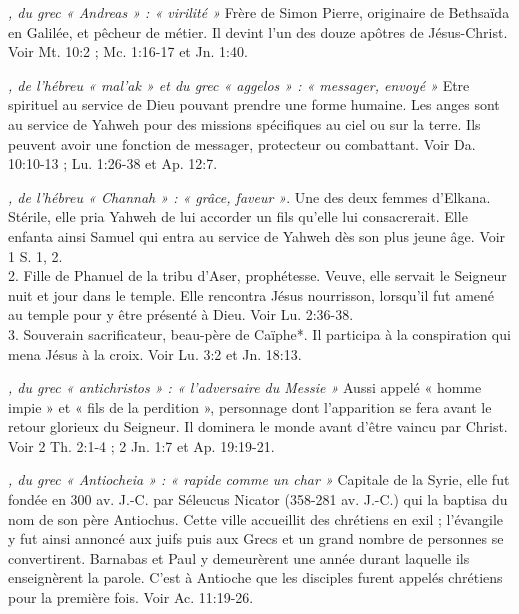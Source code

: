 \begin{multicols}{2}
\textit{, du grec « Andreas » : « virilité »}\newline
Frère de Simon Pierre, originaire de Bethsaïda en Galilée, et pêcheur de métier. Il devint l'un des douze apôtres de Jésus-Christ. Voir Mt. 10:2 ; Mc. 1:16-17 et Jn. 1:40.

\textit{, de l'hébreu « mal'ak » et du grec « aggelos » : « messager, envoyé »}\newline
Etre spirituel au service de Dieu pouvant prendre une forme humaine. Les anges sont au service de Yahweh pour des missions spécifiques au ciel ou sur la terre. Ils peuvent avoir une fonction de messager, protecteur ou combattant. Voir Da. 10:10-13 ; Lu. 1:26-38 et Ap. 12:7.

\textit{, de l'hébreu « Channah » : « grâce, faveur »}. Une des deux femmes d'Elkana. Stérile, elle pria Yahweh de lui accorder un fils qu'elle lui consacrerait. Elle enfanta ainsi Samuel qui entra au service de Yahweh dès son plus jeune âge. Voir 1 S. 1, 2.
\\2. Fille de Phanuel de la tribu d'Aser, prophétesse. Veuve, elle servait le Seigneur nuit et jour dans le temple. Elle rencontra Jésus nourrisson, lorsqu'il fut amené au temple pour y être présenté à Dieu. Voir Lu. 2:36-38.
\\3. Souverain sacrificateur, beau-père de Caïphe*. Il participa à la conspiration qui mena Jésus à la croix. Voir Lu. 3:2 et Jn. 18:13.

\textit{, du grec « antichristos » : « l'adversaire du Messie »}\newline
Aussi appelé « homme impie » et « fils de la perdition », personnage dont l'apparition se fera avant le retour glorieux du Seigneur. Il dominera le monde avant d'être vaincu par Christ. Voir 2 Th. 2:1-4 ; 2 Jn. 1:7 et Ap. 19:19-21.

\textit{, du grec « Antiocheia » : « rapide comme un char »}\newline
Capitale de la Syrie, elle fut fondée en 300 av. J.-C. par Séleucus Nicator (358-281 av. J.-C.) qui la baptisa du nom de son père Antiochus. Cette ville accueillit des chrétiens en exil ; l'évangile y fut ainsi annoncé aux juifs puis aux Grecs et un grand nombre de personnes se convertirent. Barnabas et Paul y demeurèrent une année durant laquelle ils enseignèrent la parole. C'est à Antioche que les disciples furent appelés chrétiens pour la première fois. Voir Ac. 11:19-26.


\end{multicols}
